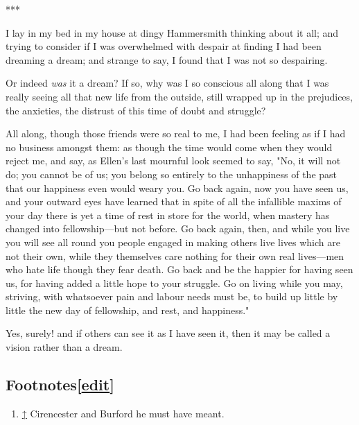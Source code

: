 *{⁠}*{⁠}*

I lay in my bed in my house at dingy Hammersmith thinking about it all;
and trying to consider if I was overwhelmed with despair at finding I
had been dreaming a dream; and strange to say, I found that I was not so
despairing.

Or indeed \emph{was} it a dream? If so, why was I so conscious all along
that I was really seeing all that new life from the outside, still
wrapped up in the prejudices, the anxieties, the distrust of this time
of doubt and struggle?

All along, though those friends were so real to me, I had been feeling
as if I had no business amongst them: as though the time would come when
they would reject me, and say, as Ellen's last mournful look seemed to
say, "No, it will not do; you cannot be of us; you belong so entirely to
the unhappiness of the past that our happiness even would weary you. Go
back again, now you have seen us, and your outward eyes have learned
that in spite of all the infallible maxims of your day there is yet a
time of rest in store for the world, when mastery has changed into
fellowship---but not before. Go back again, then, and while you live you
will see all round you people engaged in making others live lives which
are not their own, while they themselves care nothing for their own real
lives---men who hate life though they fear death. Go back and be the
happier for having seen us, for having added a little hope to your
struggle. Go on living while you may, striving, with whatsoever pain and
labour needs must be, to build up little by little the new day of
fellowship, and rest, and happiness."

Yes, surely! and if others can see it as I have seen it, then it may be
called a vision rather than a dream.

\hypertarget{footnotesedit}{%
\subsection[{{{[}}\href{/w/index.php?title=News_from_Nowhere/Chapter_XXXII\&action=edit\&section=1}{edit}{{]}}}]{\texorpdfstring{\protect\hypertarget{Footnotes}{}{Footnotes}{{{[}}\href{/w/index.php?title=News_from_Nowhere/Chapter_XXXII\&action=edit\&section=1}{edit}{{]}}}}{Footnotes{[}edit{]}}}\label{footnotesedit}}

\begin{enumerate}
\tightlist
\item
  \protect\hypertarget{cite_note-1}{}{{\protect\hyperlink{cite_ref-1}{↑}}
  {Cirencester and Burford he must have meant.}}
\end{enumerate}
